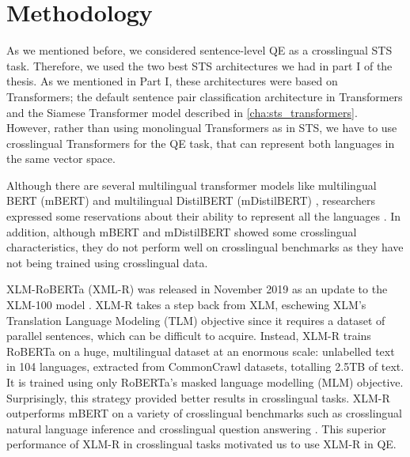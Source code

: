 \section{Methodology}

As we mentioned before, we considered sentence-level QE as a crosslingual STS task. Therefore, we used the two best STS architectures we had in part I of the thesis. As we mentioned in Part I, these architectures were based on Transformers; the default sentence pair classification architecture in Transformers and the Siamese Transformer model described in \ref{cha:sts_transformers}. However, rather than using monolingual Transformers as in STS, we have to use crosslingual Transformers for the QE task, that can represent both languages in the same vector space.

Although there are several multilingual transformer models like multilingual BERT (mBERT) \cite{devlin-etal-2019-bert} and multilingual DistilBERT (mDistilBERT) \cite{Sanh2019DistilBERTAD}, researchers expressed some reservations about their ability to represent all the languages \cite{pires-etal-2019-multilingual}. In addition, although mBERT and mDistilBERT showed some crosslingual characteristics, they do not perform well on crosslingual benchmarks \cite{karthikeyan2020cross} as they have not being trained using crosslingual data. 

XLM-RoBERTa (XML-R) was released in November 2019 \cite{conneau-etal-2020-unsupervised} as an update to the XLM-100 model \cite{lample2019cross}. XLM-R takes a step back from XLM, eschewing XLM's Translation Language Modeling (TLM) objective since it requires a dataset of parallel sentences, which can be difficult to acquire. Instead, XLM-R trains RoBERTa\cite{liu2019roberta} on a huge, multilingual dataset at an enormous scale: unlabelled text in 104 languages, extracted from CommonCrawl datasets, totalling 2.5TB of text. It is trained using only RoBERTa's \cite{liu2019roberta} masked language modelling (MLM) objective. Surprisingly, this strategy provided better results in crosslingual tasks. XLM-R outperforms mBERT on a variety of crosslingual benchmarks such as crosslingual natural language inference and crosslingual question answering \cite{conneau-etal-2020-unsupervised}. This superior performance of XLM-R in crosslingual tasks motivated us to use XLM-R in QE. 

